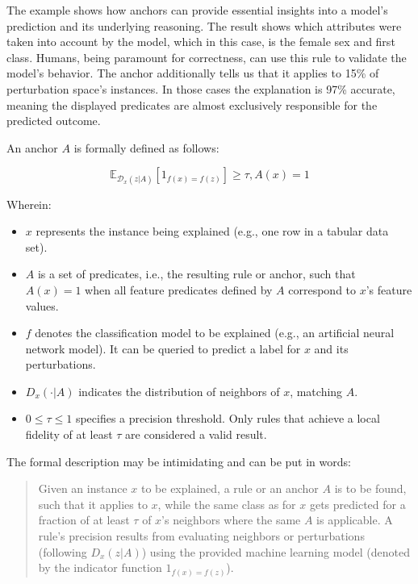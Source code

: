 \documentclass[
  12pt,
]{krantz}
\providecommand{\tightlist}{%
  \setlength{\itemsep}{0pt}\setlength{\parskip}{0pt}}
\begin{document}
The example shows how anchors can provide essential insights into a model's prediction and its underlying reasoning. The result shows which attributes were taken into account by the model, which in this case, is the female sex and first class. Humans, being paramount for correctness, can use this rule to validate the model's behavior. The anchor additionally tells us that it applies to 15\% of perturbation space's instances. In those cases the explanation is 97\% accurate, meaning the displayed predicates are almost exclusively responsible for the predicted outcome.

An anchor \(A\) is formally defined as follows:

\[\mathbb{E}_{\mathcal{D}_x(z|A)}[1_{f(x)=f(z)}]\geq\tau,A(x)=1\]

Wherein:

\begin{itemize}
\tightlist
\item
  \(x\) represents the instance being explained (e.g., one row in a tabular data set).
\item
  \(A\) is a set of predicates, i.e., the resulting rule or anchor, such that \(A(x)=1\) when all feature predicates defined by \(A\) correspond to \(x\)'s feature values.
\item
  \(f\) denotes the classification model to be explained (e.g., an artificial neural network model). It can be queried to predict a label for \(x\) and its perturbations.
\item
  \(D_x (\cdot|A)\) indicates the distribution of neighbors of \(x\), matching \(A\).
\item
  \(0 \leq \tau \leq 1\) specifies a precision threshold. Only rules that achieve a local fidelity of at least \(\tau\) are considered a valid result.
\end{itemize}

The formal description may be intimidating and can be put in words:

\begin{quote}
Given an instance \(x\) to be explained, a rule or an anchor \(A\) is to be found, such that it applies to \(x\), while the same class as for \(x\) gets predicted for a fraction of at least \(\tau\) of \(x\)'s neighbors where the same \(A\) is applicable. A rule's precision results from evaluating neighbors or perturbations (following \(D_x (z|A)\)) using the provided machine learning model (denoted by the indicator function \(1_{f(x) = f(z)}\)).
\end{quote}
\end{document}
